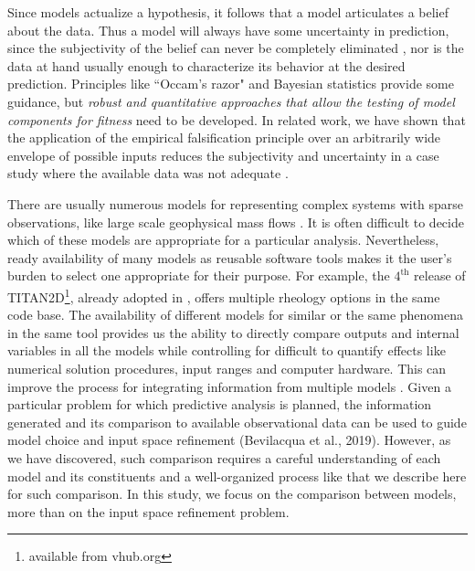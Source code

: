 \documentclass{article}
\begin{document}
Since models actualize a hypothesis, it follows  that a model articulates a belief about the data. Thus a model will always have some uncertainty in prediction, since the {subjectivity of the belief} can never be completely eliminated \citep{Kennedy2001, Higdon2004}, nor is  the data at hand  usually enough to characterize its behavior at the desired prediction. Principles like ``Occam's razor" and Bayesian statistics \citep{Farrell2015} provide some guidance, but {\it  robust and quantitative approaches that allow the  testing of model components for fitness }need to be developed. In related work, we have shown that the  application of the empirical falsification principle \citep{Popper1959} over an arbitrarily wide envelope of possible inputs reduces the subjectivity and uncertainty in a case study where the available data was not adequate \citep{Bevilacqua2019}.%

There are usually numerous models for representing complex systems with sparse observations, like large scale geophysical mass flows \cite{Kelfoun2011}. It is often difficult to decide which of these models are appropriate for a particular analysis. Nevertheless, ready availability of many models as reusable software tools makes it the user's burden to select one appropriate for their purpose.
For example, the $\mathrm{4^{\mathrm{th}}}$ release of TITAN2D\footnote{available from vhub.org}, already adopted in \citep{Bevilacqua2019}, offers multiple rheology options in the same code base. The availability of different models for similar or the same phenomena in the same tool provides us the ability to directly compare outputs and internal variables in all the models while controlling for difficult to quantify effects like numerical solution procedures, input ranges and computer hardware. This can improve the process for integrating information from multiple models \citep{Bongard2007}. Given a particular problem for which predictive analysis is planned, the information generated and its comparison to available observational data can be used to guide model choice and input space refinement (Bevilacqua et al., 2019). However, as we have discovered, such comparison requires a careful understanding of each model and its constituents and a well-organized process like that we describe here for such comparison. In this study, we focus on the comparison between models, more than on the input space refinement problem. %
\end{document}

